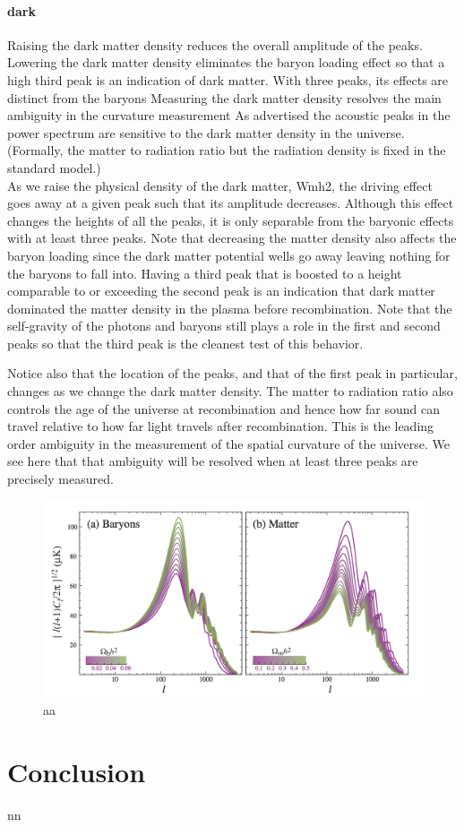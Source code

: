 \documentclass{article}
\begin{document}
\paragraph{dark}
Raising the dark matter density reduces the overall amplitude of the peaks.
Lowering the dark matter density eliminates the baryon loading effect so that a high third peak is an indication of dark matter.
With three peaks, its effects are distinct from the baryons
Measuring the dark matter density resolves the main ambiguity in the curvature measurement
As advertised the acoustic peaks in the power spectrum are sensitive to the dark matter density in the universe.  (Formally, the matter to radiation ratio but the radiation density is fixed in the standard model.)\\
As we raise the physical density of the dark matter, Wmh2, the driving effect goes away at a given peak such that its amplitude decreases.  Although this effect changes the heights of all the peaks, it is only separable from the baryonic effects with at least three peaks.  Note that decreasing the matter density also affects the baryon loading since the dark matter potential wells go away leaving nothing for the baryons to fall into. Having a third peak that is boosted to a height comparable to or exceeding the second peak is an indication that dark matter dominated the matter density in the plasma before recombination. Note that the self-gravity of the photons and baryons still plays a role in the first and second peaks so that the third peak is the cleanest test of this behavior.

Notice also that the location of the peaks, and that of the first peak in particular, changes as we change the dark matter density.  The matter to radiation ratio also controls the age of the universe at recombination and hence how far sound can travel relative to how far light travels after recombination.  This is the leading order ambiguity in the measurement of the spatial curvature of the universe.  We see here that that ambiguity will be resolved when at least three peaks are precisely measured.





\begin{figure}
\begin{center}
\includegraphics[width=\textwidth]{baryon_m}
\caption{aa}
\end{center}
\label{DM_bar}
\end{figure}
\section{Conclusion}
nn
\citep{padmanabhanDetectingDarkMatter2005}





\end{document}
